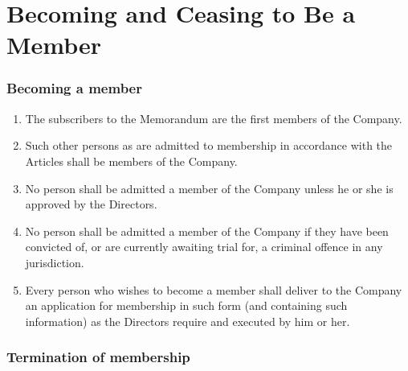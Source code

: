 \documentclass[a4paper,12pt]{article}
\begin{document}
\part{Becoming and Ceasing to Be a Member}

\section{Becoming a member}

\begin{enumerate}
  \item The subscribers to the Memorandum are the first members of the Company. %
  \item Such other persons as are admitted to membership in accordance with the Articles shall be members of the Company. %
  \item No person shall be admitted a member of the Company unless he or she is approved by the Directors. %
  \item No person shall be admitted a member of the Company if they have been convicted of, or are currently awaiting trial for, a criminal offence in any jurisdiction. %
  \item Every person who wishes to become a member shall deliver to the Company an application for membership in such form (and containing such information) as the Directors require and executed by him or her. %
\end{enumerate}

\section{Termination of membership}
\end{document}
